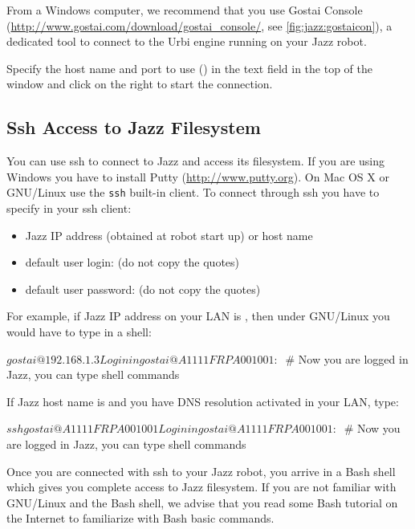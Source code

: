 From a Windows computer, we recommend that you use Gostai Console
(\url{http://www.gostai.com/download/gostai_console/}, see
\autoref{fig:jazz:gostaicon}), a dedicated tool to connect to the Urbi
engine running on your Jazz robot.

Specify the host name and port to use () in the
text field in the top of the window and click on the right to start the
connection.


\subsection{Ssh Access to Jazz Filesystem}

You can use ssh to connect to Jazz and access its filesystem. If you are
using Windows you have to install Putty (\url{http://www.putty.org}). On Mac
OS X or GNU/Linux use the \lstinline{ssh} built-in client.  To connect
through ssh you have to specify in your ssh client:
\begin{itemize}
\item Jazz IP address (obtained at robot start up) or host name
\item default user login:  (do not copy the quotes)
\item default user password:  (do not copy the quotes)
\end{itemize}

For example, if Jazz IP address on your LAN is , then
under GNU/Linux you would have to type in a shell:

\begin{shell}
$ gostai@192.168.1.3
Login in
gostai@A1111FRPA001001:~$ # Now you are logged in Jazz, you can type shell commands
\end{shell}%

If Jazz host name is  and you have DNS resolution
activated in your LAN, type:

\begin{shell}
$ ssh gostai@A1111FRPA001001
Login in
gostai@A1111FRPA001001:~$ # Now you are logged in Jazz, you can type shell commands
\end{shell}%

Once you are connected with ssh to your Jazz robot, you arrive in a Bash
shell which gives you complete access to Jazz filesystem. If you are not
familiar with GNU/Linux and the Bash shell, we advise that you read some
Bash tutorial on the Internet to familiarize with Bash basic commands.

